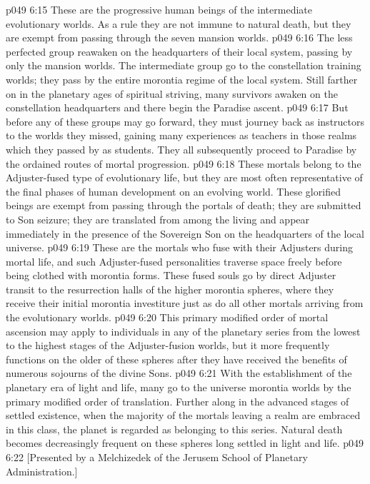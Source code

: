 \pc \vs p049 6:15 \bibnobreakspace {} These are the progressive human beings of the intermediate evolutionary worlds. As a rule they are not immune to natural death, but they are exempt from passing through the seven mansion worlds.
\vs p049 6:16 The less perfected group reawaken on the headquarters of their local system, passing by only the mansion worlds. The intermediate group go to the constellation training worlds; they pass by the entire morontia regime of the local system. Still farther on in the planetary ages of spiritual striving, many survivors awaken on the constellation headquarters and there begin the Paradise ascent.
\vs p049 6:17 But before any of these groups may go forward, they must journey back as instructors to the worlds they missed, gaining many experiences as teachers in those realms which they passed by as students. They all subsequently proceed to Paradise by the ordained routes of mortal progression.
\pc \vs p049 6:18 \bibnobreakspace {} These mortals belong to the Adjuster\hyp{}fused type of evolutionary life, but they are most often representative of the final phases of human development on an evolving world. These glorified beings are exempt from passing through the portals of death; they are submitted to Son seizure; they are translated from among the living and appear immediately in the presence of the Sovereign Son on the headquarters of the local universe.
\vs p049 6:19 These are the mortals who fuse with their Adjusters during mortal life, and such Adjuster\hyp{}fused personalities traverse space freely before being clothed with morontia forms. These fused souls go by direct Adjuster transit to the resurrection halls of the higher morontia spheres, where they receive their initial morontia investiture just as do all other mortals arriving from the evolutionary worlds.
\vs p049 6:20 This primary modified order of mortal ascension may apply to individuals in any of the planetary series from the lowest to the highest stages of the Adjuster\hyp{}fusion worlds, but it more frequently functions on the older of these spheres after they have received the benefits of numerous sojourns of the divine Sons.
\vs p049 6:21 With the establishment of the planetary era of light and life, many go to the universe morontia worlds by the primary modified order of translation. Further along in the advanced stages of settled existence, when the majority of the mortals leaving a realm are embraced in this class, the planet is regarded as belonging to this series. Natural death becomes decreasingly frequent on these spheres long settled in light and life.
\vsetoff
\vs p049 6:22 [Presented by a Melchizedek of the Jerusem School of Planetary Administration.]
